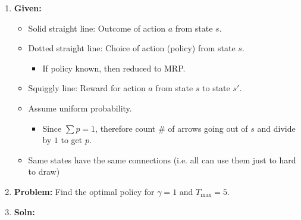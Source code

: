 \begin{example}
    \begin{enumerate}
        \item \textbf{Given:}
        \begin{itemize}
            \item Solid straight line: Outcome of action $a$ from state $s$.
            \item Dotted straight line: Choice of action (policy) from state $s$.
            \begin{itemize}
                \item If policy known, then reduced to MRP.
            \end{itemize}
            \item Squiggly line: Reward for action $a$ from state $s$ to state $s'$.
            \item Assume uniform probability. 
            \begin{itemize}
                \item Since $\sum p= 1$, therefore count \# of arrows going out of $s$ and divide by $1$ to get $p$.
            \end{itemize}
            \item Same states have the same connections (i.e. all can use them just to hard to draw)
        \end{itemize}
        \item \textbf{Problem:} Find the optimal policy for $\gamma=1$ and $T_{\max} = 5$.
        \item \textbf{Soln:}
    \end{enumerate}
\end{example}
\newpage

